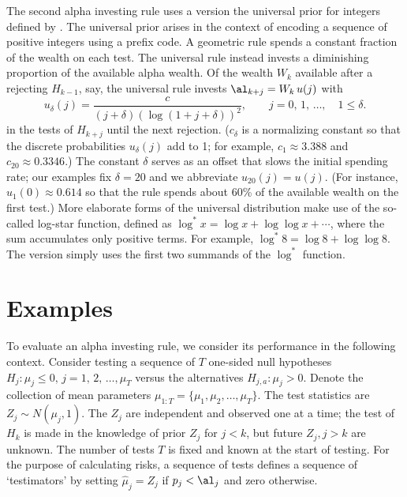 \documentclass[12pt]{article}
\begin{document}
 The second alpha investing rule uses a version the universal prior for integers
 defined by \citet{rissanen83}.  The universal prior arises in the context of
 encoding a sequence of positive integers using a prefix code.  A geometric rule
 spends a constant fraction of the wealth on each test.  The universal rule
 instead invests a diminishing proportion of the available alpha wealth.  Of the
 wealth $W_k$ available after a rejecting $H_{k-1}$, say, the universal rule
 invests $\al_{k+j} = W_k\,u(j)$ with
 \begin{equation}
   u_\delta(j) = \frac{c}{ (j+\delta) (\log (1+j+\delta))^2}, \qquad 
                 j =  0,\,1,\,\ldots, \quad 1 \le \delta.
 \label{eq:univ}
 \end{equation}
 in the tests of $H_{k+j}$ until the next rejection. ($c_\delta$ is a
 normalizing constant so that the discrete probabilities $u_\delta(j)$ add to 1;
 for example, $c_{1} \approx 3.388$ and $c_{20} \approx 0.3346$.)  The constant
 $\delta$ \marginpar{$\delta$} serves as an offset that slows the initial
 spending rate; our examples fix $\delta=20$ and we abbreviate $u_{20}(j) =
 u(j)$. (For instance, $u_1(0) \approx 0.614$ so that the rule spends about 60\%
 of the available wealth on the first test.)  More elaborate forms of the
 universal distribution make use of the so-called log-star function, defined as
 $\log^* x = \log x + \log \log x + \cdots$, where the sum accumulates only
 positive terms.  For example, $\log^{*} 8 = \log 8 + \log \log 8$.  The version
  simply uses the first two summands of the $\log^{*}$ function.
 

\section{ Examples }
 
 To evaluate an alpha investing rule, we consider its performance in the
 following context.  Consider testing a sequence of $T$ one-sided null
 hypotheses $H_j: \mu_j \le 0, \, j=1,\,2,\, \ldots, \mu_T$ versus the alternatives
 $H_{j,a}: \mu_j > 0$.   Denote the collection of mean
 parameters $\mu_{1:T} = \{\mu_1, \mu_2, \ldots, \mu_T\}$.  The test statistics
 are $Z_j \sim N(\mu_j,1)$.  The $Z_j$ are independent and observed one at a
 time; the test of $H_k$ is made in the knowledge of prior $Z_j$ for $j<k$, but
 future $Z_j, j > k$ are unknown.  The number of tests $T$ is fixed and known at
 the start of testing.  For the purpose of calculating risks, a sequence of
 tests defines a sequence of `testimators' by setting $\hat\mu_j = Z_j$ if
 $p_j<\al_j$ and zero otherwise.
 
\end{document}

